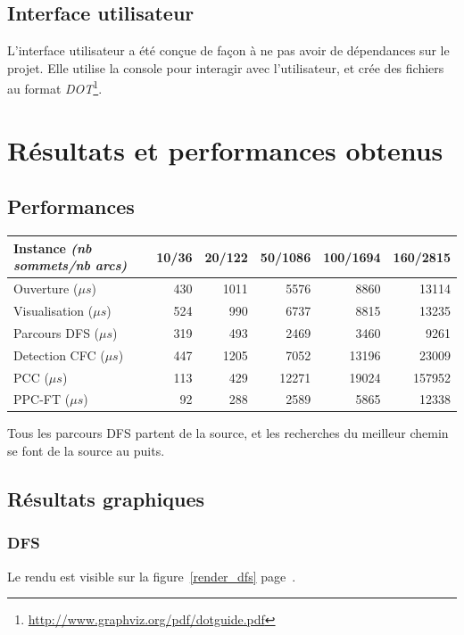 \documentclass{scrreprt}
\begin{document}
	\newpage
	\section{Interface utilisateur}
	L'interface utilisateur a été conçue de façon à ne pas avoir de dépendances sur le projet. Elle utilise la console pour interagir avec l'utilisateur, et crée des fichiers au format \textit{DOT}\footnote{\url{http://www.graphviz.org/pdf/dotguide.pdf}}.
	

	\chapter{Résultats et performances obtenus}
	\section{Performances}
	\begin{center}
		\begin{tabular}{|l|r|r|r|r|r|}
			\hline
			Instance \textit{(nb sommets/nb arcs)} & 10/36 & 20/122 & 50/1086 & 100/1694 & 160/2815 \\
			\hline
			Ouverture ($\mu s$) & 430 & 1011 & 5576 & 8860 & 13114 \\
			\hline
			Visualisation ($\mu s$) & 524 & 990 & 6737 & 8815 & 13235 \\
			\hline
			Parcours DFS ($\mu s$) & 319 & 493 & 2469 & 3460 & 9261 \\
			\hline
			Detection CFC ($\mu s$) & 447 & 1205 & 7052 & 13196 & 23009 \\
			\hline
			PCC ($\mu s$) & 113 & 429 & 12271 & 19024 & 157952 \\
			\hline
			PPC-FT ($\mu s$) & 92 & 288 & 2589 & 5865 & 12338 \\
			\hline
		\end{tabular}
	\end{center}

	Tous les parcours DFS partent de la source, et les recherches du meilleur chemin se font de la source au puits.
	
	\section{Résultats graphiques}
	\subsection{DFS}
	Le rendu est visible sur la figure~\ref{render_dfs} page~\pageref{render_dfs}.
	
\end{document}
